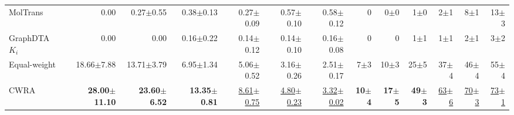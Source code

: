 \begin{table}[htbp!]
\begin{tabular}{lrrrrrr|rrrrrr}
MolTrans & 0.00 & 0.27$\pm$0.55 & 0.38$\pm$0.13 & 0.27$\pm$0.09 & 0.57$\pm$0.10 & 0.58$\pm$0.12 & 0 & 0$\pm$0 & 1$\pm$0 & 2$\pm$1 & 8$\pm$1 & 13$\pm$3 \\
GraphDTA $K_{i}$ & 0.00 & 0.00 & 0.16$\pm$0.22 & 0.14$\pm$0.12 & 0.14$\pm$0.10 & 0.16$\pm$0.08 & 0 & 0 & 1$\pm$1 & 1$\pm$1 & 2$\pm$1 & 3$\pm$2 \\
\midrule
Equal-weight & 18.66$\pm$7.88 & 13.71$\pm$3.79 & 6.95$\pm$1.34 & 5.06$\pm$0.52 & 3.16$\pm$0.26 & 2.51$\pm$0.17 & 7$\pm$3 & 10$\pm$3 & 25$\pm$5 & 37$\pm$4 & 46$\pm$4 & 55$\pm$4 \\
CWRA & \textbf{28.00$\pm$11.10} & \textbf{23.60$\pm$6.52} & \textbf{13.35$\pm$0.81} & \underline{8.61$\pm$0.75} & \underline{4.80$\pm$0.23} & \underline{3.32$\pm$0.02} & \textbf{10$\pm$4} & \textbf{17$\pm$5} & \textbf{49$\pm$3} & \underline{63$\pm$6} & \underline{70$\pm$3} & \underline{73$\pm$1} \\
\bottomrule
\end{tabular}
\end{table}